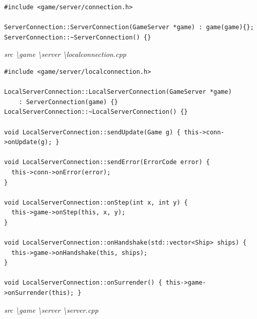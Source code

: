 \documentclass[a4paper,14pt]{extarticle}
\begin{document}
\begin{verbatim}
#include <game/server/connection.h>

ServerConnection::ServerConnection(GameServer *game) : game(game){};
ServerConnection::~ServerConnection() {}

\end{verbatim}
\textit{src \textbackslash game \textbackslash server \textbackslash localconnection.cpp}
\begin{verbatim}
#include <game/server/localconnection.h>

LocalServerConnection::LocalServerConnection(GameServer *game)
    : ServerConnection(game) {}
LocalServerConnection::~LocalServerConnection() {}

void LocalServerConnection::sendUpdate(Game g) { this->conn->onUpdate(g); }

void LocalServerConnection::sendError(ErrorCode error) {
  this->conn->onError(error);
}

void LocalServerConnection::onStep(int x, int y) {
  this->game->onStep(this, x, y);
}

void LocalServerConnection::onHandshake(std::vector<Ship> ships) {
  this->game->onHandshake(this, ships);
}

void LocalServerConnection::onSurrender() { this->game->onSurrender(this); }

\end{verbatim}
\textit{src \textbackslash game \textbackslash server \textbackslash server.cpp}
\end{document}
